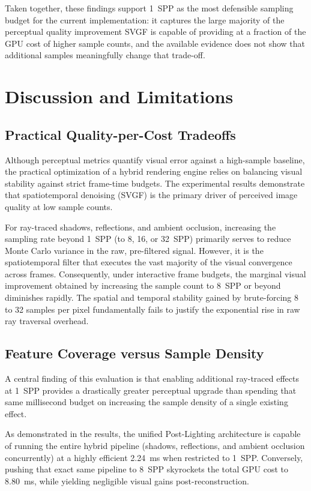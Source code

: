 \documentclass[12pt,a4paper]{report}
\newcommand{\daechapter}[1]{
  \chapter{#1}
}
\begin{document}
Taken together, these findings support 1~SPP as the most defensible sampling budget for the current implementation: it captures the large majority of the perceptual quality improvement SVGF is capable of providing at a fraction of the GPU cost of higher sample counts, and the available evidence does not show that additional samples meaningfully change that trade-off.
\daechapter{Discussion and Limitations}

\section{Practical Quality-per-Cost Tradeoffs}
Although perceptual metrics quantify visual error against a high-sample baseline, the practical optimization of a hybrid rendering engine relies on balancing visual stability against strict frame-time budgets.
The experimental results demonstrate that spatiotemporal denoising (SVGF) is the primary driver of perceived image quality at low sample counts.

For ray-traced shadows, reflections, and ambient occlusion, increasing the sampling rate beyond 1~SPP (to 8, 16, or 32~SPP) primarily serves to reduce Monte Carlo variance in the raw, pre-filtered signal.
However, it is the spatiotemporal filter that executes the vast majority of the visual convergence across frames. Consequently, under interactive frame budgets,
the marginal visual improvement obtained by increasing the sample count to 8~SPP or beyond diminishes rapidly.
The spatial and temporal stability gained by brute-forcing 8 to 32 samples per pixel fundamentally fails to justify the exponential rise in raw ray traversal overhead.

\section{Feature Coverage versus Sample Density}
A central finding of this evaluation is that enabling additional ray-traced effects at 1~SPP provides a drastically greater perceptual upgrade than spending that same millisecond budget on increasing the sample density of a single existing effect.

As demonstrated in the results, the unified Post-Lighting architecture is capable of running the entire hybrid pipeline (shadows, reflections, and ambient occlusion concurrently) at a highly efficient 2.24~ms when restricted to 1~SPP.
Conversely, pushing that exact same pipeline to 8~SPP skyrockets the total GPU cost to 8.80~ms, while yielding negligible visual gains post-reconstruction.
\end{document}
